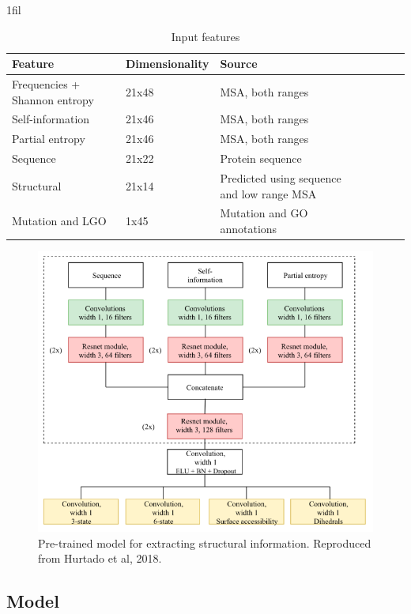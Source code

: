 \documentclass[11pt]{article}
\makeatletter
\newcommand*{\centerfloat}{%
  \parindent \z@
  \leftskip \z@ \@plus 1fil \@minus \textwidth
  \rightskip\leftskip
  \parfillskip \z@skip}
\makeatother
\begin{document}
\begin{table}
\caption{Input features}
\label{table:features}
\begin{center}
\centerfloat
\begin{tabular}{lllllll}
\toprule
Feature & Dimensionality & Source \\ 
\midrule
Frequencies + Shannon entropy & 21x48 & MSA, both ranges    \\ 
Self-information & 21x46 & MSA, both ranges \\
Partial entropy & 21x46 & MSA, both ranges  \\ 
Sequence & 21x22 & Protein sequence  \\ 
Structural & 21x14 & Predicted using sequence and low range MSA  \\ 
Mutation and LGO & 1x45 & Mutation and GO annotations  \\ 
\bottomrule
\end{tabular}
\end{center}
\end{table}

\begin{figure}
  \centering
  \includegraphics[scale=0.5]
    {ss_model.png}
  \centering
  \caption{ Pre-trained model for extracting structural information. Reproduced from Hurtado et al, 2018.\cite{hurtado2018deep} }
  \label{fig:ssmodel}
\end{figure}


\subsection{Model}
\end{document}
